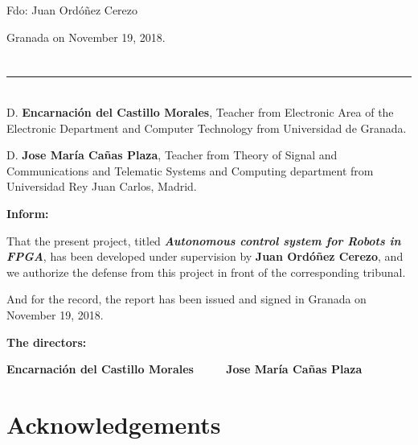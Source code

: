 \vspace{6cm}

\noindent Fdo: Juan Ordóñez Cerezo

\vspace{2cm}

\begin{flushright}
Granada on November 19, 2018.
\end{flushright}


\chapter*{}
\thispagestyle{empty}

\noindent\rule[-1ex]{\textwidth}{2pt}\\[4.5ex]

D. \textbf{Encarnación del Castillo Morales}, Teacher from Electronic Area of the Electronic Department and Computer Technology from Universidad de Granada.

\vspace{0.5cm}

D. \textbf{Jose María Cañas Plaza}, Teacher from Theory of Signal and Communications and Telematic Systems and Computing department from Universidad Rey Juan Carlos, Madrid.


\vspace{0.5cm}

\textbf{Inform:}

\vspace{0.5cm}

That the present project, titled \textit{\textbf{Autonomous control system for Robots in FPGA}},
has been developed under supervision by \textbf{Juan Ordóñez Cerezo}, and we authorize the defense from this project in front of the corresponding tribunal.

\vspace{0.5cm}

And for the record, the report has been issued and signed in Granada on November 19, 2018.

\vspace{1cm}

\textbf{The directors:}

\vspace{5cm}

\noindent \textbf{Encarnación del Castillo Morales\ \ \ \ \ Jose María Cañas Plaza}

\chapter*{Acknowledgements}
\thispagestyle{empty}

